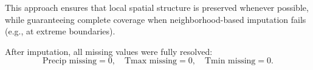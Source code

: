 This approach ensures that local spatial structure is preserved whenever possible, while guaranteeing complete coverage when neighborhood-based imputation fails (e.g., at extreme boundaries).

After imputation, all missing values were fully resolved:
\[
\text{Precip missing} = 0,\quad \text{Tmax missing} = 0,\quad \text{Tmin missing} = 0.
\]

